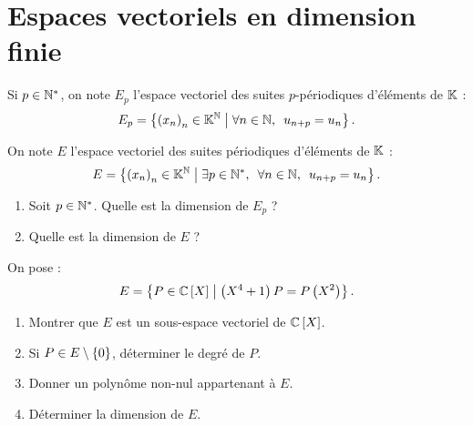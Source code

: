 \chapter{Espaces vectoriels en dimension finie}

\minitoc

\begin{exo}
Si \(p\in\mathbb{N}^*\), on note \(E_p\) l'espace vectoriel des suites \(p\)-périodiques d'éléments de \(\mathbb{K}\) : \[E_p=\accol{\paren{x_n}_n\in\K^\N\tq\quantifs{\forall n\in\N}u_{n+p}=u_n}.\]

On note \(E\) l'espace vectoriel des suites périodiques d'éléments de \(\mathbb{K}\) : \[E=\accol{\paren{x_n}_n\in\K^\N\tq\quantifs{\exists p\in\Ns;\forall n\in\N}u_{n+p}=u_n}.\]

\begin{enumerate}
\item Soit \(p\in\mathbb{N}^*\). Quelle est la dimension de \(E_p\) ? \\

\item Quelle est la dimension de \(E\) ?
\end{enumerate}
\end{exo}

\begin{corr}
\end{corr}

\begin{exo}[TPE MP 2018]
On pose : \[E=\accol{P\in\poly[\C]\tq\paren{X^4+1}P=P\paren{X^2}}.\]

\begin{enumerate}
\item Montrer que \(E\) est un sous-espace vectoriel de \(\poly[\C]\). \\

\item Si \(P\in E\setminus\left\lbrace0\right\rbrace\), déterminer le degré de \(P\). \\

\item Donner un polynôme non-nul appartenant à \(E\). \\

\item Déterminer la dimension de \(E\).
\end{enumerate}
\end{exo}

\begin{corr}
\end{corr}

